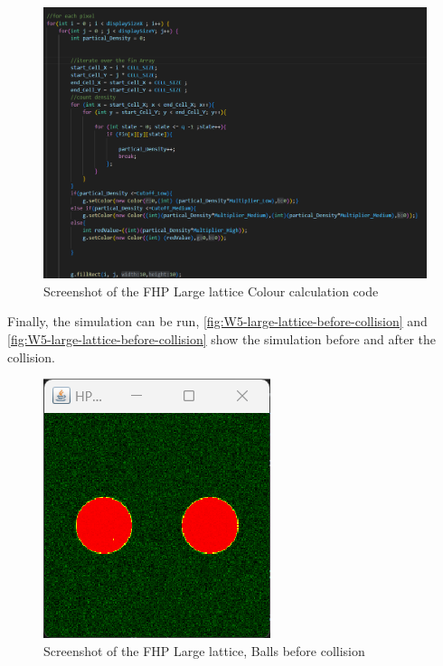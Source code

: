 \begin{figure}[H] 
   \centering
   \includegraphics[width=0.9\columnwidth]{Figures/Week 5/large-lattice/FHP large-lat color calculator.png}
   \caption{Screenshot of the FHP Large lattice Colour calculation code}
   \label{fig:W5-large-lattice-colorer}
\end{figure}

Finally, the simulation can be run, \autoref{fig:W5-large-lattice-before-collision} and \autoref{fig:W5-large-lattice-before-collision} show the simulation before and after the collision. 

\begin{figure}[H] 
   \centering
   \includegraphics[width=0.4\columnwidth]{Figures/Week 5/large-lattice/W5-before-collision.png}
   \caption{Screenshot of the FHP Large lattice, Balls before collision}
   \label{fig:W5-large-lattice-before-collision}
\end{figure}

